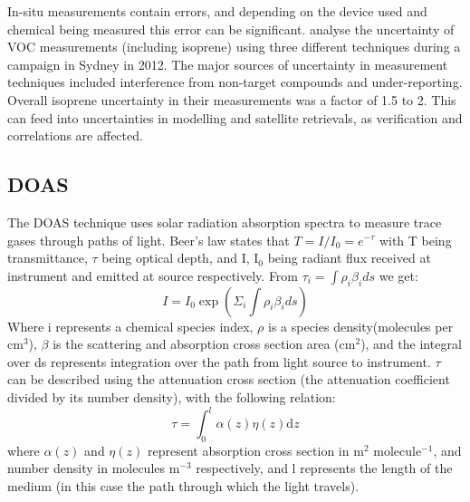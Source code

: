   In-situ measurements contain errors, and depending on the device used and chemical being measured this error can be significant.
  \cite{Dunne2017} analyse the uncertainty of VOC measurements (including isoprene) using three different techniques during a campaign in Sydney in 2012.
  The major sources of uncertainty in measurement techniques included interference from non-target compounds and under-reporting.
  Overall isoprene uncertainty in their measurements was a factor of 1.5 to 2.
  This can feed into uncertainties in modelling and satellite retrievals, as verification and correlations are affected.
  
  \subsection{DOAS}
  
    The DOAS technique uses solar radiation absorption spectra to measure trace gases through paths of light.
    Beer's law states that $ T = I/I_0 = e^{-\tau} $ with T being transmittance, $\tau$ being optical depth, and I, I$_0$ being radiant flux received at instrument and emitted at source respectively.
    From $ \tau_i = \int \rho_i \beta_i ds $ we get:
    $$ I = I_0 \exp {\left( \Sigma_i \int \rho_i \beta_i ds \right) } $$
    Where i represents a chemical species index, $\rho$ is a species density(molecules per cm$^3$), $\beta$ is the scattering and absorption cross section area (cm$^2$), and the integral over ds represents integration over the path from light source to instrument.
    $\tau$ can be described using the attenuation cross section (the attenuation coefficient divided by its number density), with the following relation:
    \begin{equation*}
      \tau = \int_0^l \alpha(z)\eta(z)\mathrm{d}z
    \end{equation*}
    where $\alpha(z)$ and $\eta(z)$ represent absorption cross section in m$^2$ molecule$^{-1}$, and number density in molecules m$^{-3}$ respectively, and l represents the length of the medium (in this case the path through which the light travels). 
    
